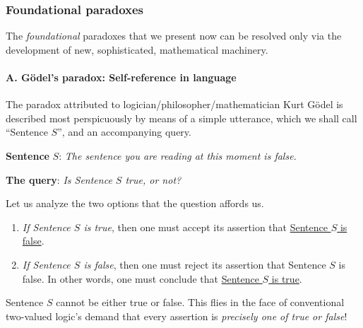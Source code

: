 

\subsubsection{Foundational paradoxes}
\label{sec:paradoxes}

The {\em foundational} paradoxes that we present now can be resolved only via the development of new, sophisticated, mathematical machinery.

\paragraph{A.  G\"{o}del's paradox: Self-reference in language}

 

The paradox attributed to logician/philosopher/mathematician Kurt G\"{o}del is described most perspicuously by means of a simple utterance, which we shall call ``Sentence $S$'', and an accompanying query.

\medskip

\noindent
{\bf Sentence} $S$:  {\em The sentence you are reading at this moment is false.}

\smallskip

\noindent
{\bf The query}: {\it Is Sentence $S$ true, or not?}

\bigskip

\noindent
Let us analyze the two options that the question affords us.
\begin{enumerate}
\item
{\em If Sentence $S$ is true}, then one must accept its assertion that \underline{Sentence $S$ is false}.

\item
{\em If Sentence $S$ is false}, then one must reject its assertion that Sentence $S$ is false.  In other words, one must conclude that \underline{Sentence $S$ is true}.
\end{enumerate}

\medskip

\noindent
Sentence $S$ cannot be either true or false.  This flies in the face of conventional two-valued logic's demand that every assertion is {\em precisely one of {\em true} or {\em false}}!

\bigskip

